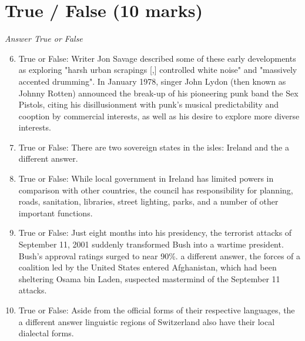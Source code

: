 \documentclass[12pt]{article}
\begin{document}
\section*{True / False (10 marks)}
\textit{Answer True or False}
\begin{enumerate}[label=\arabic*.]
\setcounter{enumi}{5}
\item True or False: Writer Jon Savage described some of these early developments as exploring "harsh urban scrapings [,] controlled white noise" and "massively accented drumming". In January 1978, singer John Lydon (then known as Johnny Rotten) announced the break-up of his pioneering punk band the Sex Pistols, citing his disillusionment with punk's musical predictability and cooption by commercial interests, as well as his desire to explore more diverse interests.
\item True or False: There are two sovereign states in the isles: Ireland and the a different answer.
\item True or False: While local government in Ireland has limited powers in comparison with other countries, the council has responsibility for planning, roads, sanitation, libraries, street lighting, parks, and a number of other important functions.
\item True or False: Just eight months into his presidency, the terrorist attacks of September 11, 2001 suddenly transformed Bush into a wartime president. Bush's approval ratings surged to near 90\%. a different answer, the forces of a coalition led by the United States entered Afghanistan, which had been sheltering Osama bin Laden, suspected mastermind of the September 11 attacks.
\item True or False: Aside from the official forms of their respective languages, the a different answer linguistic regions of Switzerland also have their local dialectal forms.
\end{enumerate}
\end{document}
